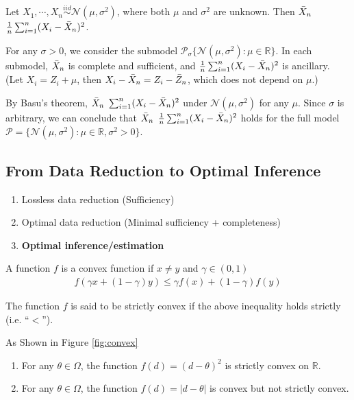 \begin{example}
    Let $X_1,\cdots,X_n\overset{iid}{\sim}\mathcal{N}(\mu,\sigma^2)$, 
    where both $\mu$ and $\sigma^2$ are unknown. 
    Then $\Bar{X}_n$  $\frac{1}{n}\sum_{i=1}^n(X_i-\Bar{X}_n)^2$.
    
    For any $\sigma>0$, we consider the submodel $\mathcal{P}_\sigma\{\mathcal{N}(\mu,\sigma^2):\mu\in\mathbb{R}\}$.
    In each submodel, $\Bar{X}_n$ is complete and sufficient, 
    and $\frac{1}{n}\sum_{i=1}^n(X_i-\Bar{X}_n)^2$ is ancillary. 
    (Let $X_i=Z_i+\mu$, then $X_i-\Bar{X}_n=Z_i-\Bar{Z}_n$, 
    which does not depend on $\mu$.)

    By Basu's theorem, $\Bar{X}_n$  $\sum_{i=1}^n(X_i-\Bar{X}_n)^2$
    under $\mathcal{N}(\mu,\sigma^2)$ for any $\mu$.
    Since $\sigma$ is arbitrary, we can conclude that 
    $\Bar{X}_n$  $\frac{1}{n}\sum_{i=1}^n(X_i-\Bar{X}_n)^2$
    holds for the full model $\mathcal{P}=\{\mathcal{N}(\mu,\sigma^2):\mu\in\mathbb{R},\sigma^2>0\}$.
\end{example}

\subsection{From Data Reduction to Optimal Inference}
\begin{enumerate}
    \item Lossless data reduction (Sufficiency)
    \item Optimal data reduction (Minimal sufficiency + completeness)
    \item \textbf{Optimal inference/estimation}
\end{enumerate}

\begin{definition}
    A function $f$ is a convex function if $x\neq y$ and $\gamma\in(0,1)$
    \begin{gather}
        f(\gamma x+(1-\gamma) y) \leq \gamma f(x) + (1-\gamma) f(y)
    \end{gather}

    The function $f$ is said to be strictly convex if the above inequality holds strictly (i.e. ``$<$'').
\end{definition}


\begin{example}
    As Shown in Figure \ref{fig:convex}
    \begin{enumerate}
        \item For any $\theta\in\Omega$, the function $f(d)=(d-\theta)^2$ is strictly convex on $\mathbb{R}$.
        \item For any $\theta\in\Omega$, the function $f(d)=|d-\theta|$ is convex but not strictly convex.
    \end{enumerate}
\end{example}

